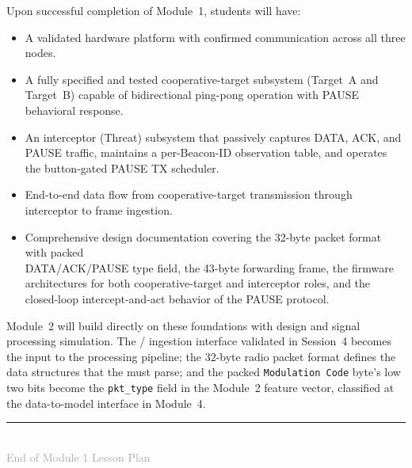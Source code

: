 \documentclass[11pt,letterpaper]{article}
\begin{document}
	Upon successful completion of Module~1, students will have:
	\begin{itemize}[leftmargin=2em]
		\item A validated hardware platform with confirmed \SPI{} communication across all three nodes.
		\item A fully specified and tested cooperative-target subsystem (Target~A and Target~B) capable of bidirectional ping-pong operation with PAUSE behavioral response.
		\item An interceptor (Threat) subsystem that passively captures DATA, ACK, and PAUSE traffic, maintains a per-Beacon-ID \RSSI{} observation table, and operates the button-gated PAUSE TX scheduler.
		\item End-to-end data flow from cooperative-target transmission through interceptor to \FPGA{} frame ingestion.
		\item Comprehensive design documentation covering the 32-byte packet format with packed  \\ DATA/ACK/PAUSE type field, the 43-byte forwarding frame, the firmware architectures for both cooperative-target and interceptor roles, and the closed-loop intercept-and-act behavior of the PAUSE protocol.
	\end{itemize}

	Module~2 will build directly on these foundations with \FPGA{} \RTL{} design and signal processing simulation. The \UART{}/\SPI{} ingestion interface validated in Session~4 becomes the input to the \FPGA{} processing pipeline; the 32-byte radio packet format defines the data structures that the \RTL{} must parse; and the packed \texttt{Modulation Code} byte's low two bits become the \texttt{pkt\_type} field in the Module~2 feature vector, classified at the data-to-model interface in Module~4.
	
	\vfill
	\clearpage
	\printnoidxglossary[type=\acronymtype,title={Glossary}]

	\begin{center}
		\rule{0.5\textwidth}{0.4pt}\\[6pt]
		{\small\textcolor{darkgray}{End of Module 1 Lesson Plan}}
	\end{center}
	
\end{document}
